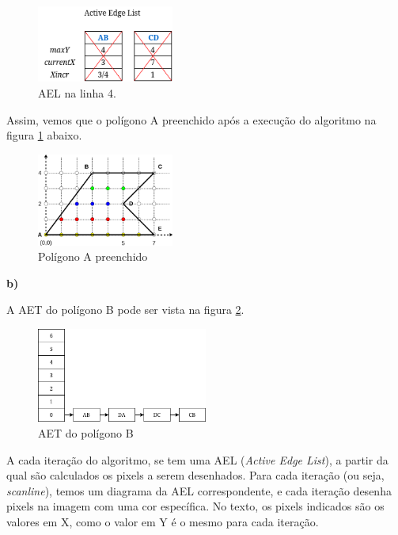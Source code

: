 \documentclass[12pt]{article}
\begin{document}
\begin{itemize}
\begin{figure}[H]
    \centering
    \includegraphics[width=0.4\textwidth]{images/3/3a_ael4.png}
    \caption*{AEL na linha 4.}
\end{figure}
\end{itemize}

Assim, vemos que o polígono A preenchido após a execução do algoritmo na figura \ref{fig:3a_final} abaixo.
\begin{figure}[H]
    \centering
    \includegraphics[width=0.4\textwidth]{images/3/3a_final.png}
    \caption{Polígono A preenchido}
    \label{fig:3a_final}
\end{figure}

\textbf{b)}

A AET do polígono B pode ser vista na figura \ref{fig:3b_aet}.

\begin{figure}[H]
    \centering
    \includegraphics[width=0.5\textwidth]{images/3/3b_aet.png}
    \caption{AET do polígono B}
    \label{fig:3b_aet}
\end{figure}

A cada iteração do algoritmo, se tem uma AEL (\textit{Active Edge List}), a partir da qual são calculados os pixels a serem desenhados. Para cada iteração (ou seja, \textit{scanline}), temos um diagrama da AEL correspondente, e cada iteração desenha pixels na imagem com uma cor específica. No texto, os pixels indicados são os valores em X, como o valor em Y é o mesmo para cada iteração.
\end{document}
